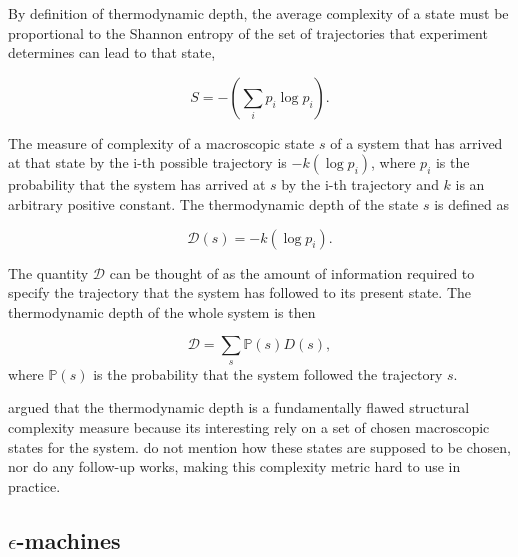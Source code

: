 By definition of thermodynamic depth, the average complexity of a state must be
proportional to the Shannon entropy
\parencite{shannonMathematicalTheoryCommunication1975} of the set of
trajectories that experiment determines can lead to that state,

\begin{equation}
  \label{eq:3}
  S = -\left(\sum_{i} p_{i} \log p_{i}\right).
\end{equation}

The measure of complexity of a macroscopic state $s$ of a system that has
arrived at that state by the i-th possible trajectory is $-k(\log p_{i})$, where
$p_{i}$ is the probability that the system has arrived at $s$ by the i-th
trajectory and $k$ is an arbitrary positive constant. The thermodynamic depth of
the state $s$ is defined as

\begin{equation}
  \label{eq:4}
  \mathcal{D}(s) = -k(\log p_{i}).
\end{equation}

The quantity $\mathcal{D}$ can be thought of as the amount of information
required to specify the trajectory that the system has followed to its present
state. The thermodynamic depth of the whole system is then

\begin{equation}
  \label{eq:5}
  \mathcal{D} = \sum_{s}\mathbb{P}(s)D(s),
\end{equation}
where $\mathbb{P}(s)$ is the probability that the system followed the
trajectory $s$.

\textcite{crutchfieldThermodynamicDepthCausal1999} argued that the thermodynamic
depth is a fundamentally flawed structural complexity measure because its
interesting rely on a set of chosen macroscopic states for the system.
\textcite{lloydComplexityThermodynamicDepth1988} do not mention how these states
are supposed to be chosen, nor do any follow-up works, making this complexity
metric hard to use in practice.

\subsection{$\epsilon$-machines}

